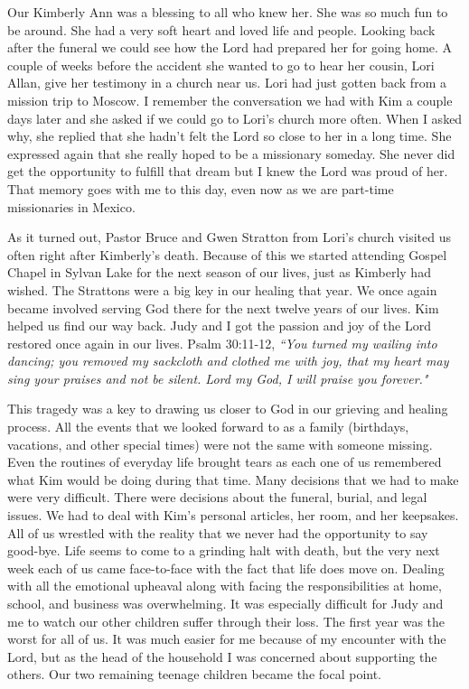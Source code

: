 \documentclass[oneside]{book}
\begin{document}
Our Kimberly Ann was a blessing to all who knew her. She was so much fun to be around. She had a very soft heart and loved life and people. Looking back after the funeral we could see how the Lord had prepared her for going home. A couple of weeks before the accident she wanted to go to hear her cousin, Lori Allan, give her testimony in a church near us. Lori had just gotten back from a mission trip to Moscow. I remember the conversation we had with Kim a couple days later and she asked if we could go to Lori's church more often. When I asked why, she replied that she hadn't felt the Lord so close to her in a long time. She expressed again that she really hoped to be a missionary someday. She never did get the opportunity to fulfill that dream but I knew the Lord was proud of her. That memory goes with me to this day, even now as we are part-time missionaries in Mexico.

As it turned out, Pastor Bruce and Gwen Stratton from Lori's church visited us often right after Kimberly's death. Because of this we started attending Gospel Chapel in Sylvan Lake for the next season of our lives, just as Kimberly had wished. The Strattons were a big key in our healing that year. We once again became involved serving God there for the next twelve years of our lives. Kim helped us find our way back. Judy and I got the passion and joy of the Lord restored once again in our lives. Psalm 30:11-12, \textit{``You turned my wailing into dancing; you removed my sackcloth and clothed me with joy, that my heart may sing your praises and not be silent. Lord my God, I will praise you forever."}

This tragedy was a key to drawing us closer to God in our grieving and healing process. All the events that we looked forward to as a family (birthdays, vacations, and other special times)  were not the same with someone missing. Even the routines of everyday life brought tears as each one of us remembered what Kim would be doing during that time. Many decisions that we had to make were very difficult. There were decisions about the funeral, burial, and legal issues. We had to deal with Kim's personal articles, her room, and her keepsakes. All of us wrestled with the reality that we never had the opportunity to say good-bye. Life seems to come to a grinding halt with death, but the very next week each of us came face-to-face with the fact that life does move on. Dealing with all the emotional upheaval along with facing the responsibilities at home, school, and business was overwhelming. It was especially difficult for Judy and me to watch our other children suffer through their loss. The first year was the worst for all of us. It was much easier for me because of my encounter with the Lord, but as the head of the household I was concerned about supporting the others. Our two remaining teenage children became the focal point.
\end{document}

